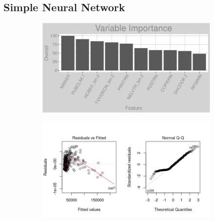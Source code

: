 \subsection{Simple Neural Network}
\label{appendix:district_heat:snn}
\begin{figure}[h]
\centering
\begin{subfigure}{1\textwidth}
\centering
\includegraphics[width=.99\textwidth, height=0.3\textheight]{Images/district_heat_nn_vars.png}
\end{subfigure}
\begin{subfigure}{1\textwidth}
\centering
\includegraphics[width=.99\textwidth, height=0.475\textheight]{Images/district_heat_nn_res_1.png}
\end{subfigure}
\end{figure}
\FloatBarrier
\newpage
